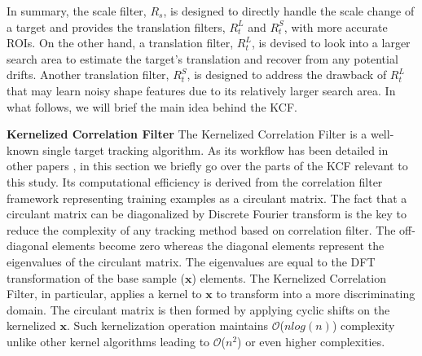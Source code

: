 \documentclass[10pt,twocolumn,letterpaper]{article}
\begin{document}
In summary, the scale filter, $R_{s}$, is designed to directly handle
the scale change of a target and provides the translation filters,
$R_{t}^{L}$ and $R_{t}^{S}$, with more accurate ROIs. On the other
hand, a translation filter, $R_{t}^{L}$, is devised to look into a
larger search area to estimate the target's translation and recover
from any potential drifts. Another translation filter, $R_{t}^{S}$, is
designed to address the drawback of $R_{t}^{L}$ that may learn noisy
shape features due to its relatively larger search area. In what
follows, we will brief the main idea behind the KCF.

\textbf{Kernelized Correlation Filter} The Kernelized Correlation
Filter is a well-known single target tracking algorithm. As its
workflow has been detailed in other papers
\cite{henriques2012exploiting,henriques2015high}, in this section we
briefly go over the parts of the KCF relevant to this study. Its
computational efficiency is derived from the correlation filter
framework representing training examples as a circulant matrix. The
fact that a circulant matrix can be diagonalized by Discrete Fourier
transform is the key to reduce the complexity of any tracking method
based on correlation filter. The off-diagonal elements become zero
whereas the diagonal elements represent the eigenvalues of the
circulant matrix. The eigenvalues are equal to the DFT transformation
of the base sample ($\boldsymbol{x}$) elements. The Kernelized
Correlation Filter, in particular, applies a kernel to
$\boldsymbol{x}$ to transform into a more discriminating domain. The
circulant matrix is then formed by applying cyclic shifts on the
kernelized $\boldsymbol{x}$. Such kernelization operation maintains
$\mathcal{O}$($nlog(n)$) complexity unlike other kernel algorithms
leading to $\mathcal{O}$($n^{2}$) or even higher complexities.
\end{document}
